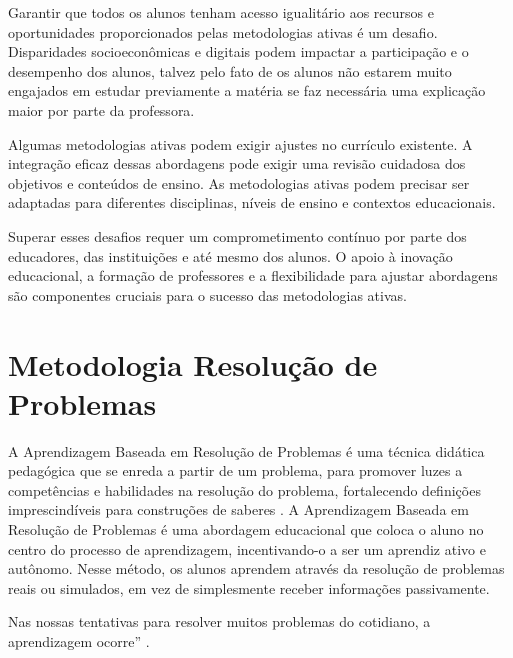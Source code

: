 Garantir que todos os alunos tenham acesso igualitário aos recursos e oportunidades proporcionados pelas metodologias ativas é um desafio. Disparidades socioeconômicas e digitais podem impactar a participação e o desempenho dos alunos, talvez pelo fato de os alunos não estarem muito engajados em estudar previamente a matéria se faz necessária uma explicação maior por parte da professora.

Algumas metodologias ativas podem exigir ajustes no currículo existente. A integração eficaz dessas abordagens pode exigir uma revisão cuidadosa dos objetivos e conteúdos de ensino. As metodologias ativas podem precisar ser adaptadas para diferentes disciplinas, níveis de ensino e contextos educacionais.

Superar esses desafios requer um comprometimento contínuo por parte dos educadores, das instituições e até mesmo dos alunos. O apoio à inovação educacional, a formação de professores e a flexibilidade para ajustar abordagens são componentes cruciais para o sucesso das metodologias ativas.

\section{Metodologia Resolução de Problemas}

A Aprendizagem Baseada em Resolução de Problemas é uma técnica didática pedagógica que se enreda a partir de um problema, para promover luzes a competências e habilidades na resolução do problema, fortalecendo definições imprescindíveis para construções de saberes \cite{SILVA_LINS_LEAO2019}. A Aprendizagem Baseada em Resolução de Problemas é uma abordagem educacional que coloca o aluno no centro do processo de aprendizagem, incentivando-o a ser um aprendiz ativo e autônomo. Nesse método, os alunos aprendem através da resolução de problemas reais ou simulados, em vez de simplesmente receber informações passivamente.


Nas nossas tentativas para resolver muitos problemas do cotidiano, a aprendizagem ocorre'' \cite[p. 55]{SOUZA2016}.

